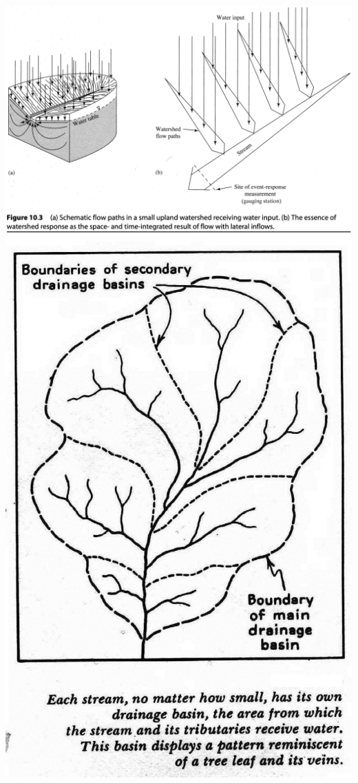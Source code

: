 \documentclass[
  letterpaper,
  DIV=11,
  numbers=noendperiod]{scrreprt}
\begin{document}
\includegraphics{archive/figures/dingman-figure10.3.png}
\includegraphics{archive/figures/watershed-boundaries.jpg}
\end{document}
